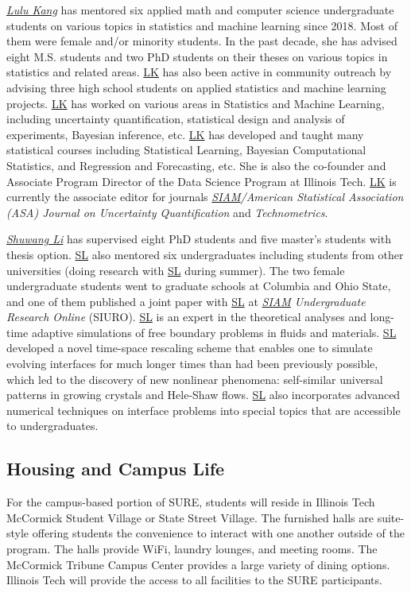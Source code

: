 \documentclass[11pt]{NSFamsart}
\newcommand{\LK}{\hyperlink{LKlink}{LK}\xspace}
\newcommand{\SL}{\hyperlink{SLlink}{SL}\xspace}
\newcommand{\SIAM}{\hyperlink{SIAMlink}{SIAM}\xspace}
\begin{document}
\noindent \underline{\textit{Lulu Kang}} has mentored six applied math and computer science undergraduate students on various topics in statistics and machine learning since 2018. Most of them were female and/or minority students. In the past decade, she has advised eight M.S. students and two PhD students on their theses on various topics in statistics and related areas. \LK has also been active in community outreach by advising three high school students on applied statistics and machine learning projects. 
\LK has worked on various areas in Statistics and Machine Learning, including uncertainty quantification, statistical design and analysis of experiments, Bayesian inference, etc. 
\LK has developed and taught many statistical courses including Statistical Learning, Bayesian Computational Statistics, and Regression and Forecasting, etc. She is also the co-founder and Associate Program Director of the Data Science Program at Illinois Tech. \LK is currently the associate editor for journals \emph{\SIAM/American Statistical Association (ASA) Journal on Uncertainty Quantification} and \emph{Technometrics}.

\noindent \underline{\textit{Shuwang Li}} has supervised eight PhD students and five master's students with thesis option. \SL also mentored six undergraduates including students from other universities (doing research with \SL during summer). The two female undergraduate students went to graduate schools at Columbia and Ohio State,  and one of them published a joint paper with \SL at {\it \SIAM Undergraduate Research Online} (SIURO). 
\SL is an expert in the theoretical analyses and
long-time adaptive simulations of free boundary problems in  fluids and
materials. \SL developed a novel time-space
rescaling scheme that enables one to simulate evolving interfaces for much
longer times than had been previously possible, which led to the discovery of new nonlinear
phenomena: self-similar universal patterns in growing crystals and Hele-Shaw  flows. \SL also incorporates advanced numerical techniques on interface problems into special topics that are accessible to undergraduates. 

 
 
\subsection{Housing and Campus Life} For the campus-based portion of SURE, students
will reside in Illinois Tech McCormick Student Village or State Street Village. The furnished halls are suite-style offering students the
convenience to interact with one another outside of the program. The halls provide WiFi, laundry
lounges, and meeting rooms. The McCormick Tribune Campus Center provides a large variety of dining options. Illinois Tech will provide the access to all facilities to the SURE participants. 
\end{document}
